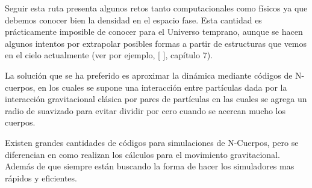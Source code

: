 



Seguir esta ruta presenta algunos retos tanto computacionales como físicos ya que debemos conocer bien la densidad en el espacio fase. Esta cantidad es prácticamente imposible de conocer para el Universo temprano, aunque se hacen algunos intentos por extrapolar posibles formas a partir de estructuras que vemos en el cielo actualmente (ver por ejemplo, [\cite[Binney]{Binney1988-rs} ], capítulo 7). 

La solución que se ha preferido es aproximar la dinámica mediante códigos de N-cuerpos, en los cuales se supone una interacción entre partículas dada por la interacción gravitacional clásica por pares de partículas en las cuales se agrega un radio de suavizado para evitar dividir por cero cuando se acercan mucho los cuerpos. 

Existen grandes cantidades de códigos para simulaciones de N-Cuerpos, pero se diferencian en como realizan los cálculos para el movimiento gravitacional. Además de que siempre están buscando la forma de hacer los simuladores mas rápidos y eficientes.

